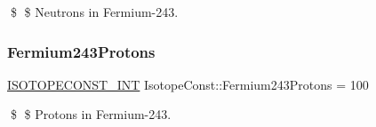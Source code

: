 \$ \$ Neutrons in Fermium-\/243. \mbox{\label{group___isotope_const-_fermium-_fm243_gab51061c89d347d337eca7f9e7af6fef2}} 
\subsubsection{\texorpdfstring{Fermium243\+Protons}{Fermium243Protons}}
{\footnotesize\ttfamily \mbox{\hyperlink{group___isotope_const-_macros_ga5f18360b3e99483a35c32d789e62621c}{I\+S\+O\+T\+O\+P\+E\+C\+O\+N\+S\+T\+\_\+\+I\+NT}} Isotope\+Const\+::\+Fermium243\+Protons = 100}

\$ \$ Protons in Fermium-\/243. 